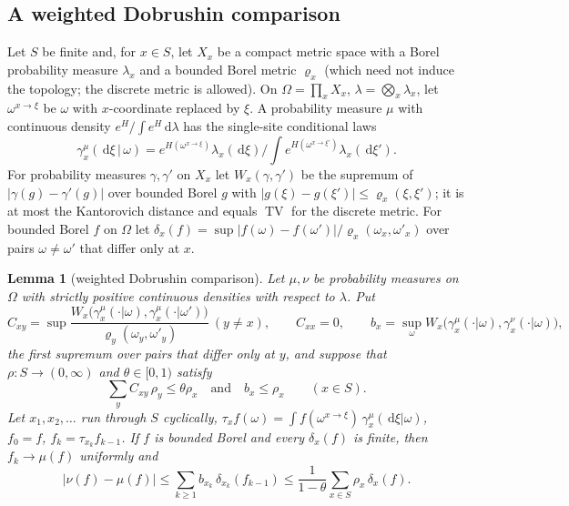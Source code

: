 \documentclass[11pt,a4paper]{amsart}
\newtheorem{lemma}[theorem]{Lemma}
\theoremstyle{definition}
\theoremstyle{remark}
\numberwithin{equation}{section}
\DeclareMathOperator{\TV}{TV}        %
\newcommand{\abs}[1]{\lvert #1\rvert}      %
\newcommand{\dd}{\,\mathrm{d}}             %
\begin{document}
\subsection{A weighted Dobrushin comparison}

Let $S$ be finite and, for $x\in S$, let $X_x$ be a compact metric space with a Borel probability measure $\lambda_x$ and a bounded Borel metric $\varrho_x$ (which need not induce the topology; the discrete metric is allowed). On $\Omega=\prod_xX_x$, $\lambda=\bigotimes_x\lambda_x$, let $\omega^{x\to\xi}$ be $\omega$ with $x$-coordinate replaced by $\xi$. A probability measure $\mu$ with continuous density $e^H/\int e^H\dd\lambda$ has the single-site conditional laws
\begin{equation}\label{eq:dob-conditional}
\gamma^\mu_x(\dd\xi\,|\,\omega)=e^{H(\omega^{x\to\xi})}\lambda_x(\dd\xi)\Big/\textstyle\int e^{H(\omega^{x\to\xi'})}\lambda_x(\dd\xi').
\end{equation}
For probability measures $\gamma,\gamma'$ on $X_x$ let $W_x(\gamma,\gamma')$ be the supremum of $\abs{\gamma(g)-\gamma'(g)}$ over bounded Borel $g$ with $\abs{g(\xi)-g(\xi')}\le\varrho_x(\xi,\xi')$; it is at most the Kantorovich distance and equals $\TV$ for the discrete metric. For bounded Borel $f$ on $\Omega$ let $\delta_x(f)=\sup\abs{f(\omega)-f(\omega')}/\varrho_x(\omega_x,\omega'_x)$ over pairs $\omega\neq\omega'$ that differ only at $x$.

\begin{lemma}[weighted Dobrushin comparison]\label{lem:dobrushin}
Let $\mu,\nu$ be probability measures on $\Omega$ with strictly positive continuous densities with respect to $\lambda$. Put
\[
C_{xy}=\sup\frac{W_x\bigl(\gamma^\mu_x(\cdot|\omega),\gamma^\mu_x(\cdot|\omega')\bigr)}{\varrho_y(\omega_y,\omega'_y)}\ (y\neq x),\qquad C_{xx}=0,\qquad
b_x=\sup_\omega W_x\bigl(\gamma^\mu_x(\cdot|\omega),\gamma^\nu_x(\cdot|\omega)\bigr),
\]
the first supremum over pairs that differ only at $y$, and suppose that $\rho:S\to(0,\infty)$ and $\theta\in[0,1)$ satisfy
\begin{equation}\label{eq:dob-hyp}
\textstyle\sum_{y}C_{xy}\,\rho_y\le\theta\rho_x\quad\text{and}\quad b_x\le\rho_x\qquad(x\in S).
\end{equation}
Let $x_1,x_2,\dots$ run through $S$ cyclically, $\tau_xf(\omega)=\int f(\omega^{x\to\xi})\,\gamma^\mu_x(\dd\xi|\omega)$, $f_0=f$, $f_k=\tau_{x_k}f_{k-1}$. If $f$ is bounded Borel and every $\delta_x(f)$ is finite, then $f_k\to\mu(f)$ uniformly and
\begin{equation}\label{eq:dob-conclusion}
\abs{\nu(f)-\mu(f)}\le\sum_{k\ge1}b_{x_k}\,\delta_{x_k}(f_{k-1})\le\frac{1}{1-\theta}\sum_{x\in S}\rho_x\,\delta_x(f).
\end{equation}
\end{lemma}
\end{document}
